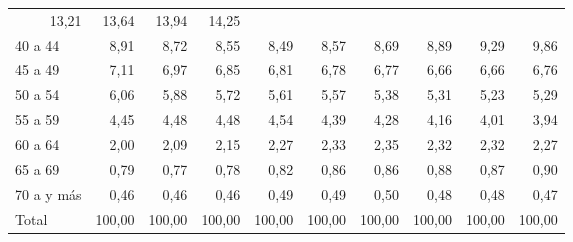 \begin{tabular}{llllllllll}
  \multicolumn{1}{r}{13,21} &
  \multicolumn{1}{r}{13,64} &
  \multicolumn{1}{r}{13,94} &
  \multicolumn{1}{r}{14,25} \\
\multicolumn{1}{l}{\hspace{1em}40 a 44} &
  \multicolumn{1}{|r}{8,91} &
  \multicolumn{1}{r}{8,72} &
  \multicolumn{1}{r}{8,55} &
  \multicolumn{1}{r}{8,49} &
  \multicolumn{1}{r}{8,57} &
  \multicolumn{1}{r}{8,69} &
  \multicolumn{1}{r}{8,89} &
  \multicolumn{1}{r}{9,29} &
  \multicolumn{1}{r}{9,86} \\
\multicolumn{1}{l}{\hspace{1em}45 a 49} &
  \multicolumn{1}{|r}{7,11} &
  \multicolumn{1}{r}{6,97} &
  \multicolumn{1}{r}{6,85} &
  \multicolumn{1}{r}{6,81} &
  \multicolumn{1}{r}{6,78} &
  \multicolumn{1}{r}{6,77} &
  \multicolumn{1}{r}{6,66} &
  \multicolumn{1}{r}{6,66} &
  \multicolumn{1}{r}{6,76} \\
\multicolumn{1}{l}{\hspace{1em}50 a 54} &
  \multicolumn{1}{|r}{6,06} &
  \multicolumn{1}{r}{5,88} &
  \multicolumn{1}{r}{5,72} &
  \multicolumn{1}{r}{5,61} &
  \multicolumn{1}{r}{5,57} &
  \multicolumn{1}{r}{5,38} &
  \multicolumn{1}{r}{5,31} &
  \multicolumn{1}{r}{5,23} &
  \multicolumn{1}{r}{5,29} \\
\multicolumn{1}{l}{\hspace{1em}55 a 59} &
  \multicolumn{1}{|r}{4,45} &
  \multicolumn{1}{r}{4,48} &
  \multicolumn{1}{r}{4,48} &
  \multicolumn{1}{r}{4,54} &
  \multicolumn{1}{r}{4,39} &
  \multicolumn{1}{r}{4,28} &
  \multicolumn{1}{r}{4,16} &
  \multicolumn{1}{r}{4,01} &
  \multicolumn{1}{r}{3,94} \\
\multicolumn{1}{l}{\hspace{1em}60 a 64} &
  \multicolumn{1}{|r}{2,00} &
  \multicolumn{1}{r}{2,09} &
  \multicolumn{1}{r}{2,15} &
  \multicolumn{1}{r}{2,27} &
  \multicolumn{1}{r}{2,33} &
  \multicolumn{1}{r}{2,35} &
  \multicolumn{1}{r}{2,32} &
  \multicolumn{1}{r}{2,32} &
  \multicolumn{1}{r}{2,27} \\
\multicolumn{1}{l}{\hspace{1em}65 a 69} &
  \multicolumn{1}{|r}{0,79} &
  \multicolumn{1}{r}{0,77} &
  \multicolumn{1}{r}{0,78} &
  \multicolumn{1}{r}{0,82} &
  \multicolumn{1}{r}{0,86} &
  \multicolumn{1}{r}{0,86} &
  \multicolumn{1}{r}{0,88} &
  \multicolumn{1}{r}{0,87} &
  \multicolumn{1}{r}{0,90} \\
\multicolumn{1}{l}{\hspace{1em}70 a y más} &
  \multicolumn{1}{|r}{0,46} &
  \multicolumn{1}{r}{0,46} &
  \multicolumn{1}{r}{0,46} &
  \multicolumn{1}{r}{0,49} &
  \multicolumn{1}{r}{0,49} &
  \multicolumn{1}{r}{0,50} &
  \multicolumn{1}{r}{0,48} &
  \multicolumn{1}{r}{0,48} &
  \multicolumn{1}{r}{0,47} \\
\multicolumn{1}{l}{\hspace{1em}Total} &
  \multicolumn{1}{|r}{100,00} &
  \multicolumn{1}{r}{100,00} &
  \multicolumn{1}{r}{100,00} &
  \multicolumn{1}{r}{100,00} &
  \multicolumn{1}{r}{100,00} &
  \multicolumn{1}{r}{100,00} &
  \multicolumn{1}{r}{100,00} &
  \multicolumn{1}{r}{100,00} &
  \multicolumn{1}{r}{100,00} \\
\cline{1-10}
\end{tabular}
